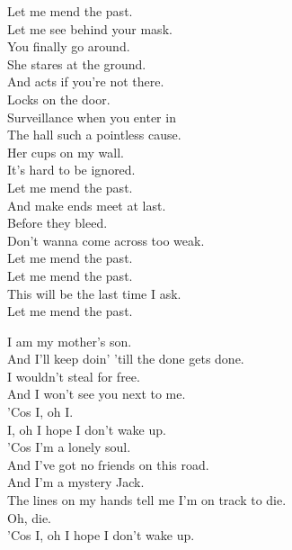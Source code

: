 Let me mend the past. \\
Let me see behind your mask. \\
You finally go around. \\
She stares at the ground. \\
And acts if you're not there. \\

Locks on the door. \\
Surveillance when you enter in \\
The hall such a pointless cause. \\
Her cups on my wall. \\
It's hard to be ignored. \\

Let me mend the past. \\
And make ends meet at last. \\
Before they bleed. \\
Don't wanna come across too weak. \\

Let me mend the past. \\
Let me mend the past. \\
This will be the last time I ask. \\
Let me mend the past. \\




I am my mother's son. \\
And I'll keep doin' 'till the done gets done. \\
I wouldn't steal for free. \\
And I won't see you next to me. \\

'Cos I, oh I. \\
I, oh I hope I don't wake up. \\

'Cos I'm a lonely soul. \\
And I've got no friends on this road. \\
And I'm a mystery Jack. \\
The lines on my hands tell me I'm on track to die. \\

Oh, die. \\
'Cos I, oh I hope I don't wake up. \\

